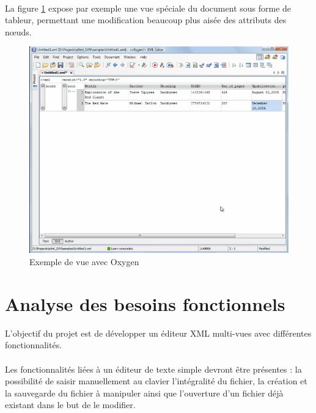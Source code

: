 \paragraph{}

La figure \ref{oxygen} expose par exemple une vue spéciale du document sous forme de tableur, permettant une modification beaucoup plus aisée des attributs des nœuds.

%

\begin{figure}[h!]
\begin{minipage}[b]{\linewidth}
\centering \includegraphics[scale=0.5]{images/analyse-oxygen1.png}
\caption{Exemple de vue avec Oxygen}
\label{oxygen}
\end{minipage}
\end{figure}


\section{Analyse des besoins fonctionnels}
L'objectif du projet est de développer un éditeur XML multi-vues avec différentes fonctionnalités.
\paragraph{}
Les fonctionnalités liées à un éditeur de texte simple devront être présentes : la possibilité de saisir manuellement au clavier l'intégralité du fichier, la création et la sauvegarde du fichier à manipuler ainsi que l'ouverture d'un fichier déjà existant dans le but de le modifier.
